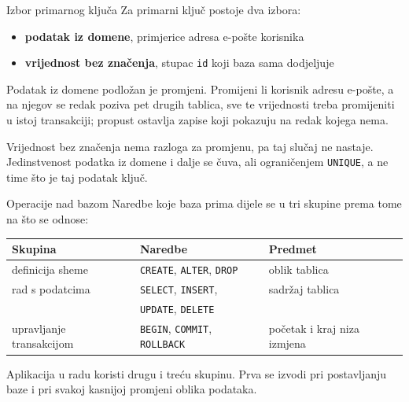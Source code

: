 \begin{frame}{Izbor primarnog ključa}
Za primarni ključ postoje dva izbora:

\begin{itemize}
  \item \textbf{podatak iz domene}, primjerice adresa e-pošte korisnika
  \item \textbf{vrijednost bez značenja}, stupac \texttt{id} koji baza sama dodjeljuje
\end{itemize}

\vspace{0.5em}
Podatak iz domene podložan je promjeni. Promijeni li korisnik adresu e-pošte, a na njegov se redak poziva pet drugih tablica, sve te vrijednosti treba promijeniti u istoj transakciji; propust ostavlja zapise koji pokazuju na redak kojega nema.

\vspace{0.4em}
Vrijednost bez značenja nema razloga za promjenu, pa taj slučaj ne nastaje. Jedinstvenost podatka iz domene i dalje se čuva, ali ograničenjem \texttt{UNIQUE}, a ne time što je taj podatak ključ.
\end{frame}

\begin{frame}{Operacije nad bazom}
Naredbe koje baza prima dijele se u tri skupine prema tome na što se odnose:

\vspace{0.6em}
\begin{center}
{\small
\setlength{\tabcolsep}{8pt}
\renewcommand{\arraystretch}{1.4}
\begin{tabular}{@{}lll@{}}
  \toprule
  \textbf{Skupina} & \textbf{Naredbe} & \textbf{Predmet} \\
  \midrule
  definicija sheme     & \texttt{CREATE}, \texttt{ALTER}, \texttt{DROP}   & oblik tablica \\
  rad s podatcima      & \texttt{SELECT}, \texttt{INSERT},                & sadržaj tablica \\
                       & \texttt{UPDATE}, \texttt{DELETE}                 & \\
  upravljanje transakcijom & \texttt{BEGIN}, \texttt{COMMIT}, \texttt{ROLLBACK} & početak i kraj niza izmjena \\
  \bottomrule
\end{tabular}
}
\end{center}

\vspace{0.5em}
Aplikacija u radu koristi drugu i treću skupinu. Prva se izvodi pri postavljanju baze i pri svakoj kasnijoj promjeni oblika podataka.
\end{frame}

